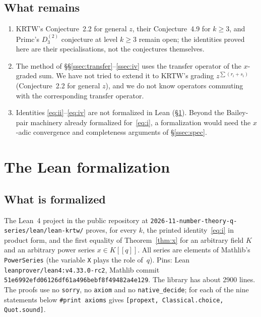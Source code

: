 \documentclass[11pt]{amsart}
\theoremstyle{definition}
\numberwithin{equation}{section}
\newcommand{\repo}{\nolinkurl{2026-11-number-theory-q-series/}}
\newcommand{\fpath}[1]{\nolinkurl{#1}}
\begin{document}
\subsection{What remains}\label{ssec:remain}
\begin{enumerate}[leftmargin=2em]
\item KRTW's Conjecture~2.2 for general $z$, their Conjecture~4.9 for $k\ge3$, and Primc's $D_3^{(2)}$ conjecture at
level $k\ge3$ remain open; the identities proved here are their specialisations, not the conjectures themselves.
\item The method of §§\ref{ssec:transfer}--\ref{ssec:iv} uses the transfer operator of the $x$-graded sum. We
have not tried to extend it to KRTW's grading $z^{\sum(r_i+s_i)}$ (Conjecture~2.2 for general $z$), and we do not
know operators commuting with the corresponding transfer operator.
\item Identities \eqref{eq:ii}--\eqref{eq:iv} are not formalized in Lean (§\ref{sec:lean}). Beyond the Bailey-pair
machinery already formalized for~\eqref{eq:i}, a formalization would need the $x$-adic convergence and
completeness arguments of §\ref{ssec:spec}.
\end{enumerate}

\section{The Lean formalization}\label{sec:lean}

\subsection{What is formalized}
The Lean~4 project in the public repository at \repo\fpath{lean/lean-krtw/} proves, for every $k$, the printed identity~\eqref{eq:i} in product
form, and the first equality of Theorem~\ref{thm:x} for an arbitrary field $K$ and an arbitrary power
series $x\in K[[q]]$. All series are elements of Mathlib's \texttt{PowerSeries} (the variable \texttt{X}
plays the role of~$q$). Pins: Lean \texttt{leanprover/lean4:v4.33.0-rc2}, Mathlib commit
\texttt{51e6992efd06\allowbreak126df61a496bebf8\allowbreak f49482a4e129}. The library has about 2900 lines. The proofs use
no \texttt{sorry}, no \texttt{axiom} and no \texttt{native\_decide}; for each of the nine statements below
\verb|#print axioms| gives \texttt{[propext, Classical.choice, Quot.sound]}.
\end{document}
